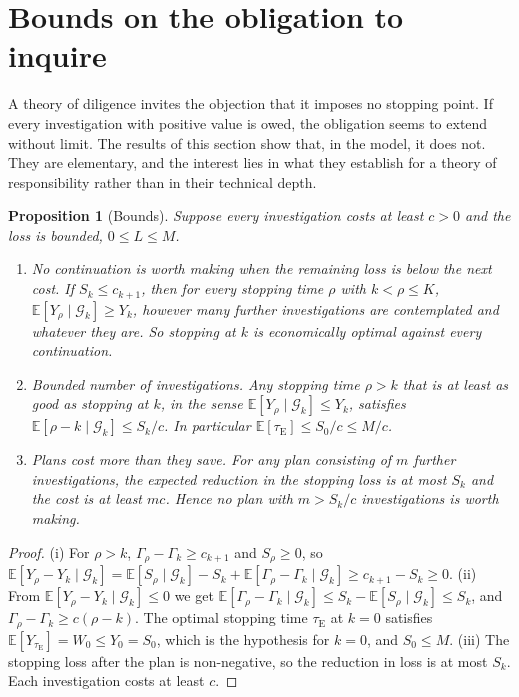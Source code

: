 \documentclass[11pt]{article}
\newcommand{\G}{\mathcal G}
\newcommand{\E}{\mathbb E}
\newcommand{\tE}{\tau_{\mathrm E}}
\theoremstyle{plain}
\newtheorem{proposition}{Proposition}
\theoremstyle{definition}
\begin{document}
\section{Bounds on the obligation to inquire}\label{sec:bounds}

A theory of diligence invites the objection that it imposes no stopping point. If every investigation with positive value is owed, the obligation seems to extend without limit. The results of this section show that, in the model, it does not. They are elementary, and the interest lies in what they establish for a theory of responsibility rather than in their technical depth.

\begin{proposition}[Bounds]\label{prop:bounds}
Suppose every investigation costs at least $c>0$ and the loss is bounded, $0\le L\le M$.
\begin{enumerate}[label=(\roman*),nosep]
\item \emph{No continuation is worth making when the remaining loss is below the next cost.} If $S_k\le c_{k+1}$, then for every stopping time $\rho$ with $k<\rho\le K$, $\E[Y_\rho\mid\G_k]\ge Y_k$, however many further investigations are contemplated and whatever they are. So stopping at $k$ is economically optimal against every continuation.
\item \emph{Bounded number of investigations.} Any stopping time $\rho>k$ that is at least as good as stopping at $k$, in the sense $\E[Y_\rho\mid\G_k]\le Y_k$, satisfies $\E[\rho-k\mid\G_k]\le S_k/c$. In particular $\E[\tE]\le S_0/c\le M/c$.
\item \emph{Plans cost more than they save.} For any plan consisting of $m$ further investigations, the expected reduction in the stopping loss is at most $S_k$ and the cost is at least $mc$. Hence no plan with $m>S_k/c$ investigations is worth making.
\end{enumerate}
\end{proposition}

\begin{proof}
(i) For $\rho>k$, $\Gamma_\rho-\Gamma_k\ge c_{k+1}$ and $S_\rho\ge0$, so $\E[Y_\rho-Y_k\mid\G_k]=\E[S_\rho\mid\G_k]-S_k+\E[\Gamma_\rho-\Gamma_k\mid\G_k]\ge c_{k+1}-S_k\ge0$.
(ii) From $\E[Y_\rho-Y_k\mid\G_k]\le0$ we get $\E[\Gamma_\rho-\Gamma_k\mid\G_k]\le S_k-\E[S_\rho\mid\G_k]\le S_k$, and $\Gamma_\rho-\Gamma_k\ge c(\rho-k)$. The optimal stopping time $\tE$ at $k=0$ satisfies $\E[Y_{\tE}]=W_0\le Y_0=S_0$, which is the hypothesis for $k=0$, and $S_0\le M$.
(iii) The stopping loss after the plan is non-negative, so the reduction in loss is at most $S_k$. Each investigation costs at least $c$.
\end{proof}
\end{document}
